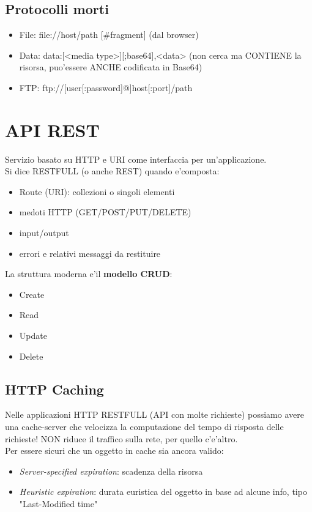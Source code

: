 \documentclass[a4paper,12pt]{article}
\begin{document}
\subsection{Protocolli morti}
\begin{itemize}
    \item File: file://host/path [\#fragment] (dal browser)
    \item Data: data:[<media type>][;base64],<data> (non cerca ma CONTIENE la risorsa, puo'essere ANCHE codificata in Base64)
    \item FTP: ftp://[user[:password]@]host[:port]/path
\end{itemize}
\section{API REST}
Servizio basato su HTTP e URI come interfaccia per un'applicazione. \\
Si dice RESTFULL (o anche REST) quando e'composta:
\begin{itemize}
    \item Route (URI): collezioni o singoli elementi
    \item medoti HTTP (GET/POST/PUT/DELETE)
    \item input/output
    \item errori e relativi messaggi da restituire
\end{itemize}
La struttura moderna e'il \textbf{modello CRUD}:
\begin{itemize}
    \item Create
    \item Read
    \item Update
    \item Delete
\end{itemize}
\subsection{HTTP Caching}
Nelle applicazioni HTTP RESTFULL (API con molte richieste) possiamo avere una cache-server che velocizza la computazione del tempo di risposta delle richieste! NON riduce il traffico sulla rete, per quello c'e'altro. \\
Per essere sicuri che un oggetto in cache sia ancora valido:
\begin{itemize}
    \item \textit{Server-specified expiration}: scadenza della risorsa
    \item \textit{Heuristic expiration}: durata euristica del oggetto in base ad alcune info, tipo "Last-Modified time" 
\end{itemize}
\end{document}
